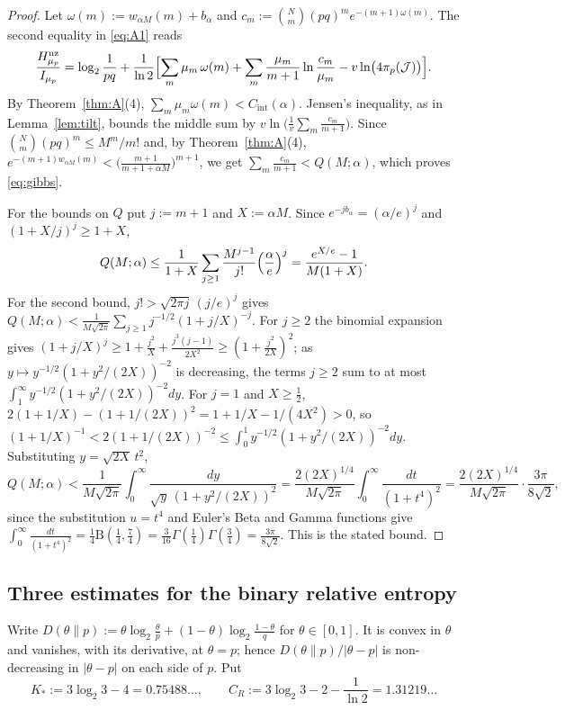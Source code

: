 \documentclass[11pt]{amsart}
\theoremstyle{remark}
\newcommand{\J}{\mathcal{J}}
\begin{document}
\begin{proof}
Let $\omega(m) := w_{\alpha M}(m) + b_\alpha$ and $c_m := \binom{N}{m}(pq)^m e^{-(m+1)\omega(m)}$. The second equality in \eqref{eq:A1} reads
\[
\frac{H^{\mathrm{nz}}_{\mu_p}}{I_{\mu_p}} = \log_2\frac{1}{pq} + \frac{1}{\ln 2}\Bigl[\sum_m \mu_m\,\omega(m) + \sum_m \frac{\mu_m}{m+1}\ln\frac{c_m}{\mu_m} - v\ln\bigl(4\pi_p(\J)\bigr)\Bigr].
\]
By Theorem~\ref{thm:A}(4), $\sum_m \mu_m\omega(m) < C_{\mathrm{int}}(\alpha)$. Jensen's inequality, as in Lemma~\ref{lem:tilt}, bounds the middle sum by $v\ln\bigl(\frac1v\sum_m \frac{c_m}{m+1}\bigr)$. Since $\binom{N}{m}(pq)^m \le M^m/m!$ and, by Theorem~\ref{thm:A}(4), $e^{-(m+1)w_{\alpha M}(m)} < \bigl(\frac{m+1}{m+1+\alpha M}\bigr)^{m+1}$, we get $\sum_m \frac{c_m}{m+1} < Q(M;\alpha)$, which proves \eqref{eq:gibbs}.

For the bounds on $Q$ put $j := m + 1$ and $X := \alpha M$. Since $e^{-jb_\alpha} = (\alpha/e)^j$ and $(1 + X/j)^j \ge 1 + X$,
\[
Q(M;\alpha) \le \frac{1}{1+X}\sum_{j \ge 1}\frac{M^{j-1}}{j!}\Bigl(\frac{\alpha}{e}\Bigr)^j = \frac{e^{X/e} - 1}{M(1+X)}.
\]
For the second bound, $j! > \sqrt{2\pi j}\,(j/e)^j$ gives $Q(M;\alpha) < \frac{1}{M\sqrt{2\pi}}\sum_{j \ge 1} j^{-1/2}(1 + j/X)^{-j}$. For $j \ge 2$ the binomial expansion gives $(1 + j/X)^j \ge 1 + \frac{j^2}{X} + \frac{j^3(j-1)}{2X^2} \ge (1 + \frac{j^2}{2X})^2$; as $y \mapsto y^{-1/2}(1 + y^2/(2X))^{-2}$ is decreasing, the terms $j \ge 2$ sum to at most $\int_1^\infty y^{-1/2}(1 + y^2/(2X))^{-2}dy$. For $j = 1$ and $X \ge \frac12$, $2(1 + 1/X) - (1 + 1/(2X))^2 = 1 + 1/X - 1/(4X^2) > 0$, so $(1 + 1/X)^{-1} < 2(1 + 1/(2X))^{-2} \le \int_0^1 y^{-1/2}(1 + y^2/(2X))^{-2}dy$. Substituting $y = \sqrt{2X}\,t^2$,
\[
Q(M;\alpha) < \frac{1}{M\sqrt{2\pi}}\int_0^\infty \frac{dy}{\sqrt y\,(1 + y^2/(2X))^2} = \frac{2(2X)^{1/4}}{M\sqrt{2\pi}}\int_0^\infty\frac{dt}{(1+t^4)^2} = \frac{2(2X)^{1/4}}{M\sqrt{2\pi}}\cdot\frac{3\pi}{8\sqrt2},
\]
since the substitution $u = t^4$ and Euler's Beta and Gamma functions give $\int_0^\infty\frac{dt}{(1+t^4)^2} = \frac14\mathrm{B}(\tfrac14, \tfrac74) = \frac{3}{16}\Gamma(\tfrac14)\Gamma(\tfrac34) = \frac{3\pi}{8\sqrt2}$. This is the stated bound.
\end{proof}

\subsection{Three estimates for the binary relative entropy}\label{ssec:est}
Write $D(\theta\|p) := \theta\log_2\frac{\theta}{p} + (1-\theta)\log_2\frac{1-\theta}{q}$ for $\theta \in [0,1]$. It is convex in $\theta$ and vanishes, with its derivative, at $\theta = p$; hence $D(\theta\|p)/|\theta - p|$ is non-decreasing in $|\theta - p|$ on each side of $p$. Put
\[
K_* := 3\log_2 3 - 4 = 0.75488\dots, \qquad C_R := 3\log_2 3 - 2 - \frac{1}{\ln 2} = 1.31219\dots
\]
\end{document}
